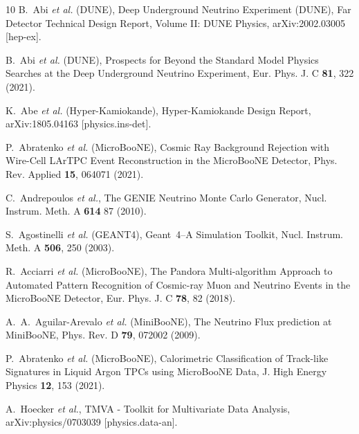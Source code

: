 \documentclass[aps,prl,twocolumn,superscriptaddress]{revtex4}
\begin{document}
\begin{thebibliography}{10}
B.~Abi \textit{et al.} (DUNE),
Deep Underground Neutrino Experiment (DUNE), Far Detector Technical Design Report, Volume II: DUNE Physics,
arXiv:2002.03005 [hep-ex].

B.~Abi \textit{et al.} (DUNE),
Prospects for Beyond the Standard Model Physics Searches at the Deep Underground Neutrino Experiment,
Eur. Phys. J. C \textbf{81}, 322 (2021).

K.~Abe \textit{et al.} (Hyper-Kamiokande),
Hyper-Kamiokande Design Report,
arXiv:1805.04163 [physics.ins-det].

P.~Abratenko \textit{et al.} (MicroBooNE),
Cosmic Ray Background Rejection with Wire-Cell LArTPC Event Reconstruction in the MicroBooNE Detector,
Phys. Rev. Applied \textbf{15}, 064071 (2021).

C.~Andrepoulos \textit{et al.},
The GENIE Neutrino Monte Carlo Generator,
Nucl. Instrum. Meth. A \textbf{614} 87 (2010).

S.~Agostinelli \textit{et al.} (GEANT4),
{\sc Geant}~4--A Simulation Toolkit,
Nucl. Instrum. Meth. A \textbf{506}, 250 (2003).


R.~Acciarri \textit{et al.} (MicroBooNE),
The Pandora Multi-algorithm Approach to Automated Pattern Recognition of Cosmic-ray Muon and Neutrino Events in the MicroBooNE Detector,
Eur. Phys. J. C \textbf{78}, 82 (2018).

A.~A.~Aguilar-Arevalo \textit{et al.} (MiniBooNE),
The Neutrino Flux prediction at MiniBooNE,
Phys. Rev. D \textbf{79}, 072002 (2009).


P.~Abratenko \textit{et al.} (MicroBooNE),
Calorimetric Classification of Track-like Signatures in Liquid Argon TPCs using MicroBooNE Data,
J. High Energy Physics \textbf{12}, 153 (2021).

A.~Hoecker \textit{et al.},
TMVA - Toolkit for Multivariate Data Analysis,
arXiv:physics/0703039 [physics.data-an].


\end{thebibliography}
\end{document}
